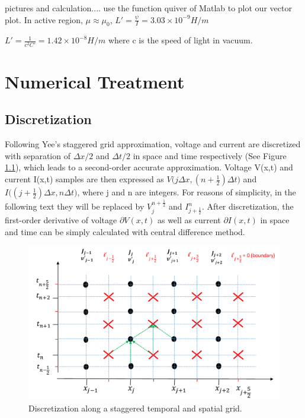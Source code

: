 \documentclass[11pt,final]{scrbook}
\begin{document}
 pictures and calculation....
 use the function quiver of Matlab to plot our vector plot.
 In active region, $\mu\approx \mu_{0}$,
  $L'=\frac{\psi}{I}=3.03\times 10^{-9} H/m$
  
    $L'=\frac{1}{c^{2}C'}=1.42\times 10^{-8} H/m$
where c is the speed of light in vacuum.
\chapter{Numerical Treatment}
\section{Discretization}
Following Yee’s staggered grid approximation\cite{yee1966numerical}, voltage and current are discretized with separation of $\Delta x/2$ and $\Delta t/2$ in space and time respectively (See Figure \ref{fig:Discretisation}), which leads to a second-order accurate approximation. Voltage V(x,t) and current I(x,t) samples are then expressed as $ V\big(j\Delta x, (n+\frac{1}{2})\Delta t\big)$ and $ I\big((j+\frac{1}{2})\Delta x, n\Delta t\big)$, where j and n are integers. For reasons of simplicity, in the following text they will be replaced by $ V _{ j }^{ n+\frac{1}{2}}$ and ${ I }_{ j+\frac{1}{2} }^{ n }$. After discretization, the first-order derivative of voltage $\partial V(x,t)$ as well as current $\partial I(x,t)$ in space and time can be simply calculated with central difference method\cite{yang2012central}. 
\begin{figure}[htbp]
\begin{center}
\includegraphics[scale=0.6]{images/Discretization}
\caption{Discretization along a staggered temporal and spatial grid.}
\label{fig:Discretisation}
\end{center}
\end{figure}
\end{document}
